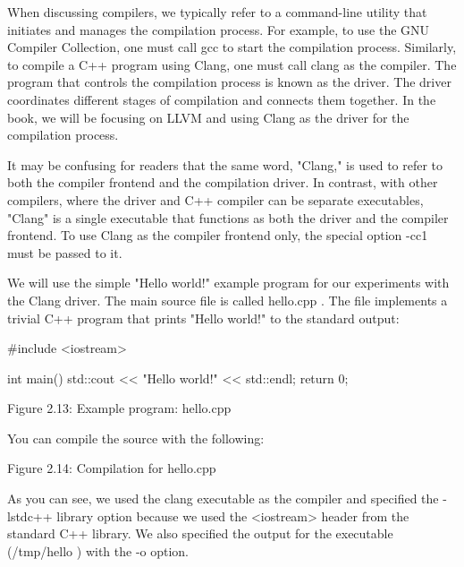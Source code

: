 When discussing compilers, we typically refer to a command-line utility that initiates and manages the compilation process. For example, to use the GNU Compiler Collection, one must call gcc to start the compilation process. Similarly, to compile a C++ program using Clang, one must call clang as the compiler. The program that controls the compilation process is known as the driver. The driver coordinates different stages of compilation and connects them together. In the book, we will be focusing on LLVM and using Clang as the driver for the compilation process.

It may be confusing for readers that the same word, "Clang," is used to refer to both the compiler frontend and the compilation driver. In contrast, with other compilers, where the driver and C++ compiler can be separate executables, "Clang" is a single executable that functions as both the driver and the compiler frontend. To use Clang as the compiler frontend only, the special option -cc1 must be passed to it.


We will use the simple "Hello world!" example program for our experiments with the Clang driver. The main source file is called hello.cpp . The file implements a trivial C++ program that prints "Hello world!" to the standard output:

\begin{cpp}
#include <iostream>

int main() {
  std::cout << "Hello world!" << std::endl;
  return 0;
}
\end{cpp}

\begin{center}
Figure 2.13: Example program: hello.cpp
\end{center}

You can compile the source with the following:


\begin{center}
Figure 2.14: Compilation for hello.cpp
\end{center}

As you can see, we used the clang executable as the compiler and specified the -lstdc++ library option because we used the <iostream> header from the standard C++ library. We also specified the output for the executable (/tmp/hello ) with the -o option.

